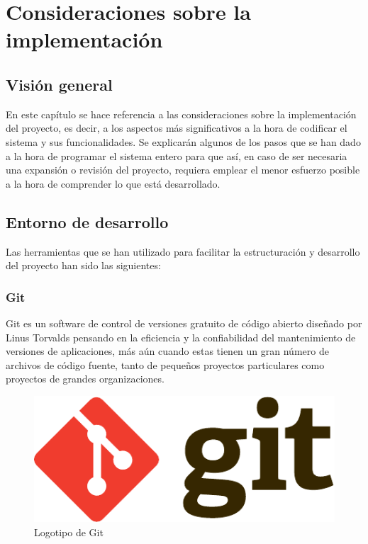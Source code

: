 \chapter{Consideraciones sobre la implementación}

\section{Visión general}

En este capítulo se hace referencia a las consideraciones sobre la implementación del proyecto, es decir, a los aspectos más significativos a la hora de codificar el sistema y sus funcionalidades. Se explicarán algunos de los pasos que se han dado a la hora de programar el sistema entero para que así, en caso de ser necesaria una expansión o revisión del proyecto, requiera emplear el menor esfuerzo posible a la hora de comprender lo que está desarrollado.

\section{Entorno de desarrollo}

Las herramientas que se han utilizado para facilitar la estructuración y desarrollo del proyecto han sido las siguientes:

\subsection{Git}

Git\cite{Git} es un software de control de versiones gratuito de código abierto diseñado por Linus Torvalds pensando en la eficiencia y la confiabilidad del mantenimiento de versiones de aplicaciones, más aún cuando estas tienen un gran número de archivos de código fuente, tanto de pequeños proyectos particulares como proyectos de grandes organizaciones. 

\begin{figure}[!htp]
	 \centering
	 \includegraphics[scale=0.8]{fig/git_logo}
	 \caption{Logotipo de Git}
\end{figure}

